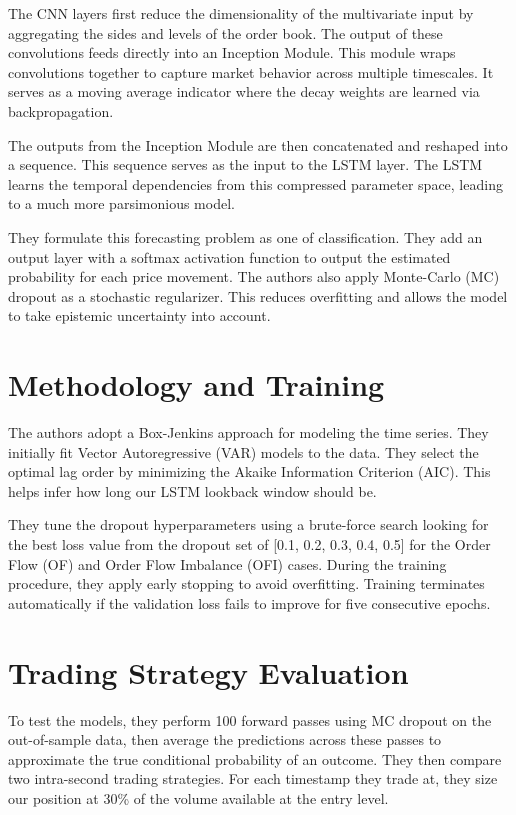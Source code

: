 The CNN layers first reduce the dimensionality of the multivariate input by aggregating the sides and levels of the order book. The output of these convolutions feeds directly into an Inception Module. This module wraps convolutions together to capture market behavior across multiple timescales. It serves as a moving average indicator where the decay weights are learned via backpropagation. 

The outputs from the Inception Module are then concatenated and reshaped into a sequence. This sequence serves as the input to the LSTM layer. The LSTM learns the temporal dependencies from this compressed parameter space, leading to a much more parsimonious model. 

They formulate this forecasting problem as one of classification. They add an output layer with a softmax activation function to output the estimated probability for each price movement. The authors also apply Monte-Carlo (MC) dropout as a stochastic regularizer. This reduces overfitting and allows the model to take epistemic uncertainty into account.

\section{Methodology and Training}

The authors adopt a Box-Jenkins approach for modeling the time series. They initially fit Vector Autoregressive (VAR) models to the data. They select the optimal lag order by minimizing the Akaike Information Criterion (AIC). This helps infer how long our LSTM lookback window should be.

They tune the dropout hyperparameters using a  brute-force search looking for the best loss value from the dropout set of [0.1, 0.2, 0.3, 0.4, 0.5] for the Order Flow (OF) and Order Flow Imbalance (OFI) cases. During the training procedure, they apply early stopping to avoid overfitting. Training terminates automatically if the validation loss fails to improve for five consecutive epochs.

\section{Trading Strategy Evaluation}

To test the models, they perform 100 forward passes using MC dropout on the out-of-sample data, then average the predictions across these passes to approximate the true conditional probability of an outcome. They then compare two intra-second trading strategies. For each timestamp they trade at, they size our position at 30\% of the volume available at the entry level.

